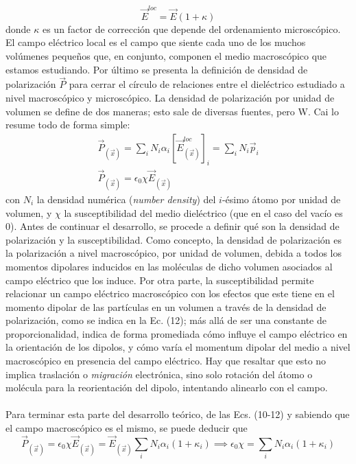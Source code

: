 \documentclass[12pt, notitlepage]{article}
\begin{document}
\begin{equation}
\vec{E}^{loc} = \vec{E}(1 + \kappa)
\end{equation}
donde $\kappa$ es un factor de corrección que depende del ordenamiento microscópico. El campo eléctrico local es el campo que siente cada uno de los muchos volúmenes pequeños que, en conjunto, componen el medio macroscópico que estamos estudiando. Por último se presenta la definición de densidad de polarización $\vec{P}$ para cerrar el círculo de relaciones entre el dieléctrico estudiado a nivel macroscópico y microscópico. La densidad de polarización por unidad de volumen se define de dos maneras; esto sale de diversas fuentes, pero W. Cai \cite{Cai} lo resume todo de forma simple:
\begin{gather}
\vec{P}_{(\vec{x})} = \sum_i N_i\alpha_i\left[\vec{E}_{(\vec{x})}^{loc}\right]_i = \sum_i N_i\vec{p}_i\\
\vec{P}_{(\vec{x})} = \epsilon_0\chi\vec{E}_{(\vec{x})}
\end{gather}
con $N_i$ la densidad numérica (\textit{number density}) del $i$-ésimo átomo por unidad de volumen, y $\chi$ la susceptibilidad del medio dieléctrico (que en el caso del vacío es 0). Antes de continuar el desarrollo, se procede a definir qué son la densidad de polarización y la susceptibilidad. Como concepto, la densidad de polarización es la polarización a nivel macroscópico, por unidad de volumen, debida a todos los momentos dipolares inducidos en las moléculas de dicho volumen asociados al campo eléctrico que los induce. Por otra parte, la susceptibilidad permite relacionar un campo eléctrico macroscópico con los efectos que este tiene en el momento dipolar de las partículas en un volumen a través de la densidad de polarización, como se indica en la Ec. (12); más allá de ser una constante de proporcionalidad, indica de forma promediada cómo influye el campo eléctrico en la orientación de los dipolos, y cómo varía el momentum dipolar del medio a nivel macroscópico en presencia del campo eléctrico. Hay que resaltar que esto no implica traslación o \textit{migración} electrónica, sino solo rotación del átomo o molécula para la reorientación del dipolo, intentando alinearlo con el campo.\\\\
Para terminar esta parte del desarrollo teórico, de las Ecs. (10-12) y sabiendo que el campo macroscópico es el mismo, se puede deducir que
\begin{equation}
\vec{P}_{(\vec{x})} = \epsilon_0\chi\vec{E}_{(\vec{x})} = \vec{E}_{(\vec{x})}\sum_iN_i\alpha_i(1+\kappa_i) \implies \epsilon_0\chi = \sum_iN_i\alpha_i(1+\kappa_i)
\end{equation}
\end{document}
